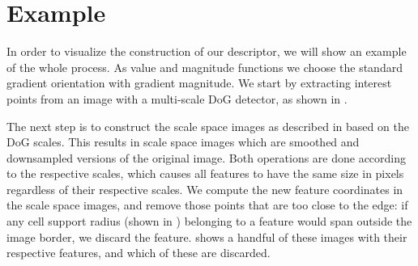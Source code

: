 \documentclass[thesis.tex]{subfiles}
\begin{document}
\section{Example} \label{sec:proposedDescriptorExample}
%
In order to visualize the construction of our descriptor, we will show an example of the whole process. As value and magnitude functions we choose the standard gradient orientation with gradient magnitude. We start by extracting interest points from an image with a multi-scale DoG detector, as shown in .

The next step is to construct the scale space images as described in  based on the DoG scales. This results in scale space images which are smoothed and downsampled versions of the original image. Both operations are done according to the respective scales, which causes all features to have the same size in pixels regardless of their respective scales. We compute the new feature coordinates in the scale space images, and remove those points that are too close to the edge: if any cell support radius (shown in ) belonging to a feature would span outside the image border, we discard the feature.  shows a handful of these images with their respective features, and which of these are discarded.
\end{document}
